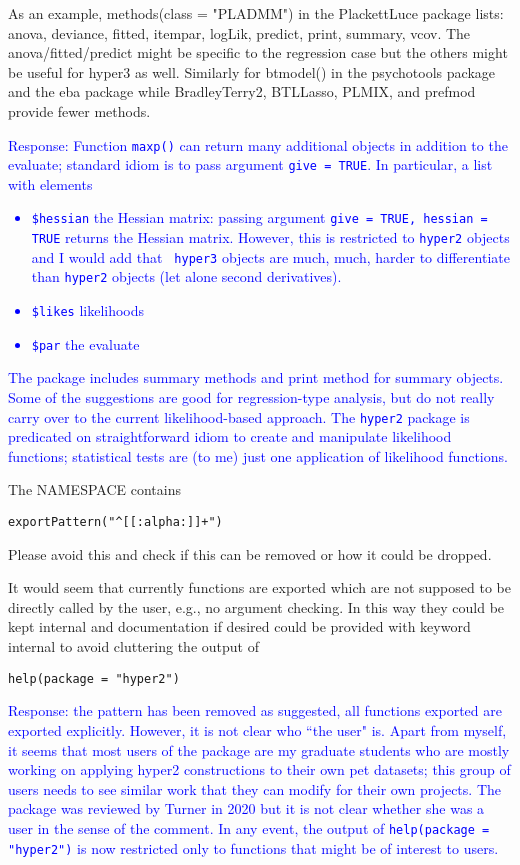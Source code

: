 \documentclass[12pt]{article}
\begin{document}
As an example, methods(class = "PLADMM") in the PlackettLuce package
lists: anova, deviance, fitted, itempar, logLik, predict, print,
summary, vcov. The anova/fitted/predict might be specific to the
regression case but the others might be useful for hyper3 as
well. Similarly for btmodel() in the psychotools package and the eba
package while BradleyTerry2, BTLLasso, PLMIX, and prefmod provide
fewer methods.

\textcolor{blue}{Response: Function {\tt maxp()} can return many
  additional objects in addition to the evaluate; standard idiom is to
  pass argument {\tt give = TRUE}.  In particular, a list with
  elements
  \begin{itemize}
  \item {\tt \$hessian} the Hessian matrix: passing argument {\tt give
    = TRUE, hessian = TRUE} returns the Hessian matrix.  However, this
    is restricted to {\tt hyper2} objects and I would add that {\tt
      hyper3} objects are much, much, harder to differentiate than
    {\tt hyper2} objects (let alone second derivatives).
    \item {\tt \$likes} likelihoods
    \item {\tt \$par} the evaluate
  \end{itemize}
  The package includes summary methods and print method for summary
  objects.\\ Some of the suggestions are good for regression-type
  analysis, but do not really carry over to the current
  likelihood-based approach.  The {\tt hyper2} package is predicated
  on straightforward idiom to create and manipulate likelihood
  functions; statistical tests are (to me) just one application of
  likelihood functions.}

The NAMESPACE contains

\verb=exportPattern("^[[:alpha:]]+")=

Please avoid this and check if this can be removed or how it could be
dropped.

It would seem that currently functions are exported which are not
supposed to be directly called by the user, e.g., no argument
checking. In this way they could be kept internal and documentation if
desired could be provided with keyword internal to avoid cluttering
the output of

\verb+help(package = "hyper2")+

\textcolor{blue}{Response: the pattern has been removed as suggested,
  all functions exported are exported explicitly.  However, it is not
  clear who ``the user" is.  Apart from myself, it seems that most
  users of the package are my graduate students who are mostly working
  on applying hyper2 constructions to their own pet datasets; this
  group of users needs to see similar work that they can modify for
  their own projects.  The package was reviewed by Turner in 2020 but
  it is not clear whether she was a user in the sense of the
  comment. In any event, the output of {\tt help(package = "hyper2")}
  is now restricted only to functions that might be of interest to
  users.  }
\end{document}
